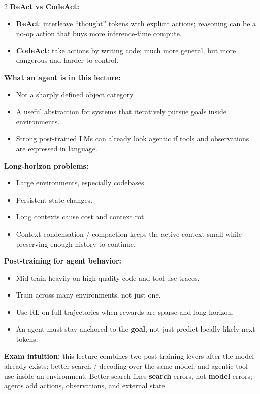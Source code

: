 \documentclass[10pt]{article}
\begin{document}
\begin{multicols*}{2}
\textbf{ReAct vs CodeAct:}
\begin{itemize}
\item \textbf{ReAct}: interleave ``thought'' tokens with explicit actions; reasoning can be a no-op action that buys more inference-time compute.
\item \textbf{CodeAct}: take actions by writing code; much more general, but more dangerous and harder to control.
\end{itemize}

\textbf{What an agent is in this lecture:}
\begin{itemize}
\item Not a sharply defined object category.
\item A useful abstraction for systems that iteratively pursue goals inside environments.
\item Strong post-trained LMs can already look agentic if tools and observations are expressed in language.
\end{itemize}

\textbf{Long-horizon problems:}
\begin{itemize}
\item Large environments, especially codebases.
\item Persistent state changes.
\item Long contexts cause cost and context rot.
\item Context condensation / compaction keeps the active context small while preserving enough history to continue.
\end{itemize}

\textbf{Post-training for agent behavior:}
\begin{itemize}
\item Mid-train heavily on high-quality code and tool-use traces.
\item Train across many environments, not just one.
\item Use RL on full trajectories when rewards are sparse and long-horizon.
\item An agent must stay anchored to the \textbf{goal}, not just predict locally likely next tokens.
\end{itemize}

\textbf{Exam intuition:} this lecture combines two post-training levers after the model already exists: better search / decoding over the same model, and agentic tool use inside an environment. Better search fixes \textbf{search} errors, not \textbf{model} errors; agents add actions, observations, and external state.


\end{multicols*}
\end{document}
